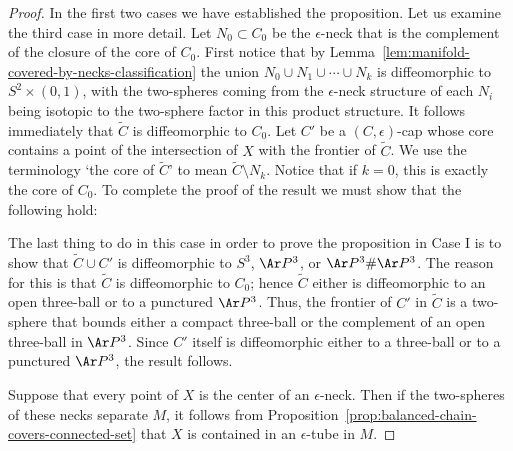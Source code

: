 \begin{proof}
In the first two cases we have established the proposition. Let us
examine the third case in more detail. Let $N_0\subset C_0$ be the
$\epsilon$-neck that is the complement of the closure of the core of
$C_0$.
 First notice that by
Lemma~\ref{lem:manifold-covered-by-necks-classification} the union $N_0\cup N_1\cup\cdots\cup N_k$ is
diffeomorphic to $S^2\times (0,1)$, with the two-spheres coming from
the $\epsilon$-neck structure of each $N_i$ being isotopic to the
two-sphere factor in this product structure. It follows immediately
that $\widetilde C$ is diffeomorphic to $C_0$. Let $C'$ be a
$(C,\epsilon)$-cap whose core contains a point of the intersection
of $X$ with the frontier of $\widetilde C$. We use the terminology
`the core of $\widetilde C$' to mean $\widetilde C\setminus N_k$.
Notice that if $k=0$, this is exactly the core of $C_0$. To complete
the proof of the result we must show that the following hold:

The last thing to do in this case in order to prove the proposition
in Case I is to show that $\widetilde C\cup C'$ is diffeomorphic to
$S^3$, $\Ar P^3$, or $\Ar P^3\#\Ar P^3$. The reason for this is that
$\widetilde C$ is diffeomorphic to $C_0$;  hence $\widetilde C$
either is diffeomorphic to an open three-ball or to a punctured $\Ar
P^3$. Thus, the frontier of $C'$ in $\widetilde C$ is a two-sphere
that bounds either a compact three-ball or the complement of an open
three-ball in $\Ar P^3$. Since $C'$ itself is diffeomorphic either
to a three-ball or to a punctured $\Ar P^3$, the result follows.

 Suppose that every point of $X$ is the
center of an $\epsilon$-neck. Then if the two-spheres of these necks
separate $M$, it follows from Proposition~\ref{prop:balanced-chain-covers-connected-set} that $X$
is contained in an $\epsilon$-tube in $M$.


\end{proof}
